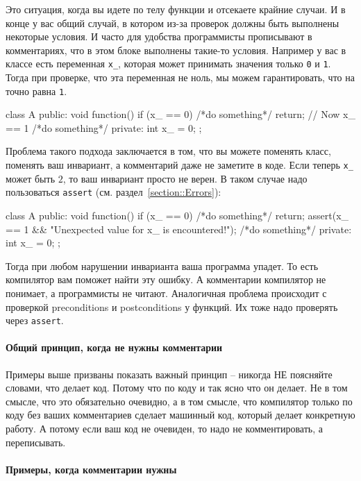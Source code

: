 Это ситуация, когда вы идете по телу функции и отсекаете крайние случаи.
И в конце у вас общий случай, в котором из-за проверок должны быть выполнены некоторые условия.
И часто для удобства программисты прописывают в комментариях, что в этом блоке выполнены такие-то условия.
Например у вас в классе есть переменная \verb"x_", которая может принимать значения только \verb"0" и \verb"1".
Тогда при проверке, что эта переменная не ноль, мы можем гарантировать, что на точно равна \verb"1".
\begin{cppcode}
class A {
public:
  void function() {
    if (x_ == 0) {
      /*do something*/
      return;
    }
    // Now x_ == 1
    /*do something*/
  }
private:
  int x_ = 0;
};
\end{cppcode}
Проблема такого подхода заключается в том, что вы можете поменять класс, поменять ваш инвариант, а комментарий даже не заметите в коде.
Если теперь \verb"x_" может быть $2$, то ваш инвариант просто не верен.
В таком случае надо пользоваться \verb"assert" (см. раздел~\ref{section::Errors}):
\begin{cppcode}
class A {
public:
  void function() {
    if (x_ == 0) {
      /*do something*/
      return;
    }
    assert(x_ == 1 && "Unexpected value for x_ is encountered!");
    /*do something*/
  }
private:
  int x_ = 0;
};
\end{cppcode}
Тогда при любом нарушении инварианта ваша программа упадет.
То есть компилятор вам поможет найти эту ошибку.
А комментарии компилятор не понимает, а программисты не читают.
Аналогичная проблема происходит с проверкой preconditions и postconditions у функций.
Их тоже надо проверять через \verb"assert".

\paragraph{Общий принцип, когда не нужны комментарии}

Примеры выше призваны показать важный принцип -- никогда НЕ поясняйте словами, что делает код.
Потому что по коду и так ясно что он делает.
Не в том смысле, что это обязательно очевидно, а в том смысле, что компилятор только по коду без ваших комментариев сделает машинный код, который делает конкретную работу.
А потому если ваш код не очевиден, то надо не комментировать, а переписывать.

\paragraph{Примеры, когда комментарии нужны}

